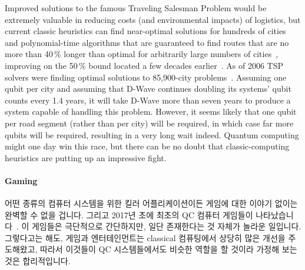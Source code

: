 Improved solutions to the famous Traveling Salesman Problem would
be extremely valuable in reducing costs (and environmental impacts)
of logistics, but current classic heuristics can find near-optimal
solutions for hundreds of cities~\cite{Martin:1992:LMC:2307953.2308141}
and polynomial-time algorithms that are guaranteed to find routes
that are no more than 40\,\% longer than optimal for arbitrarily
large numbers of cities~\cite{Sebo:2014:STN:2688265.2688281},
improving on the 50\,\% bound located a few decades
earlier~\cite{NicosChristofides1976TSP-FiftyPercent}.
As of 2006 TSP solvers were finding optimal solutions to
85,900-city problems~\cite{DLApplegate2007TSPtextbook}.
Assuming one qubit per city and assuming that D-Wave continues doubling
its systems' qubit counts every 1.4 years, it will take D-Wave more than seven
years to produce a system capable of handling this problem.
However, it seems likely that one qubit per road segment (rather than per city)
will be required, in which case far more qubits will be required,
resulting in a very long wait indeed.
Quantum computing might one day win this race, but there can be no doubt that
classic-computing heuristics are putting up an impressive fight.
\fi

\paragraph{Gaming}
\label{sec:future:Gaming}

어떤 종류의 컴퓨터 시스템을 위한 킬러 어플리케이션이든 게임에 대한 이야기
없이는 완벽할 수 없을 겁니다.
그리고 2017년 초에 최초의 QC 컴퓨터 게임들이
나타났습니다~\cite{JamesWootton2017IBMQEgame,JamesWootton2017IBMQEbattleship}.
이 게임들은 극단적으로 간단하지만, 일단 존재한다는 것 자체가 놀라운 일입니다.
그렇다고는 해도, 게임과 엔터테인먼트는 classical 컴퓨팅에서 상당히 많은 개선을
주도해왔고, 따라서 이것들이 QC 시스템들에서도 비슷한 역할을 할 것이라 가정해
보는 것은 합리적입니다.

